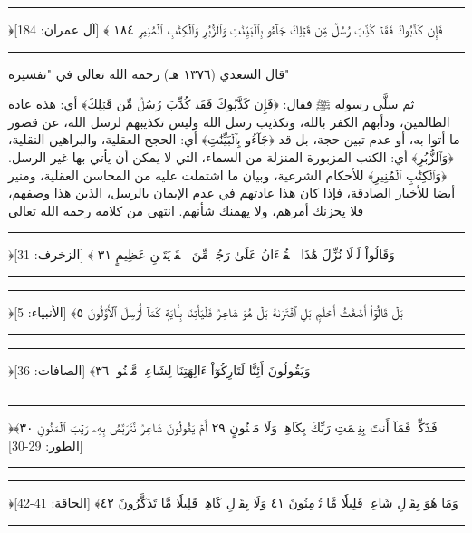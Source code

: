 \documentclass[12pt,openany]{book}
\newenvironment{quranblock}
  {\par\medskip\begin{center}\begin{minipage}{0.92\linewidth}\centering\quranfont\large\color{ink}\hrule\vspace{0.65em}}
  {\vspace{0.65em}\hrule\end{minipage}\end{center}\medskip}
\newenvironment{sourceintro}
  {\par\medskip\noindent\titlefont\color{gold}}
  {\par\smallskip}
\begin{document}
\begin{quranblock}
﴿فَإِن كَذَّبُوكَ فَقَدۡ كُذِّبَ رُسُلٞ مِّن قَبۡلِكَ جَآءُو بِٱلۡبَيِّنَٰتِ وَٱلزُّبُرِ ‌وَٱلۡكِتَٰبِ ٱلۡمُنِيرِ ١٨٤ ﴾ [آل عمران: 184]
\end{quranblock}

\begin{sourceintro}قال السعدي (١٣٧٦ هـ) رحمه الله تعالى في "تفسيره"\end{sourceintro}

ثم سلَّى رسوله ﷺ فقال: ﴿فَإِن كَذَّبُوكَ فَقَدۡ كُذِّبَ رُسُلٞ مِّن قَبۡلِكَ﴾ أي: هذه عادة الظالمين، ودأبهم الكفر بالله، وتكذيب رسل الله وليس تكذيبهم لرسل الله، عن قصور ما أتوا به، أو عدم تبين حجة، بل قد ﴿جَآءُو بِٱلۡبَيِّنَٰتِ﴾ أي: الحجج العقلية، والبراهين النقلية، ﴿وَٱلزُّبُرِ﴾ أي: الكتب المزبورة المنزلة من السماء، التي لا يمكن أن يأتي بها غير الرسل. ﴿وَٱلۡكِتَٰبِ ٱلۡمُنِيرِ﴾ للأحكام الشرعية، وبيان ما اشتملت عليه من المحاسن العقلية، ومنير أيضا للأخبار الصادقة، فإذا كان هذا عادتهم في عدم الإيمان بالرسل، الذين هذا وصفهم، فلا يحزنك أمرهم، ولا يهمنك شأنهم. انتهى من كلامه رحمه الله تعالى

\begin{quranblock}
﴿وَقَالُواْ لَوۡلَا نُزِّلَ هَٰذَا ٱلۡقُرۡءَانُ عَلَىٰ رَجُلٖ مِّنَ ٱلۡقَرۡيَتَيۡنِ عَظِيمٍ ٣١ ﴾ [الزخرف: 31]
\end{quranblock}

\begin{quranblock}
﴿بَلۡ قَالُوٓاْ أَضۡغَٰثُ أَحۡلَٰمِۭ بَلِ ٱفۡتَرَىٰهُ بَلۡ هُوَ ‌شَاعِرٞ فَلۡيَأۡتِنَا بِـَٔايَةٖ كَمَآ أُرۡسِلَ ٱلۡأَوَّلُونَ ٥﴾ [الأنبياء: 5]
\end{quranblock}

\begin{quranblock}
﴿وَيَقُولُونَ أَئِنَّا لَتَارِكُوٓاْ ءَالِهَتِنَا ‌لِشَاعِرٖ مَّجۡنُونِۭ ٣٦﴾ [الصافات: 36]
\end{quranblock}

\begin{quranblock}
﴿فَذَكِّرۡ فَمَآ أَنتَ بِنِعۡمَتِ رَبِّكَ بِكَاهِنٖ وَلَا مَجۡنُونٍ ٢٩ أَمۡ يَقُولُونَ ‌شَاعِرٞ نَّتَرَبَّصُ بِهِۦ رَيۡبَ ٱلۡمَنُونِ ٣٠﴾ [الطور: 29-30]
\end{quranblock}

\begin{quranblock}
﴿وَمَا هُوَ بِقَوۡلِ ‌شَاعِرٖۚ قَلِيلٗا مَّا تُؤۡمِنُونَ ٤١ وَلَا بِقَوۡلِ كَاهِنٖۚ قَلِيلٗا مَّا تَذَكَّرُونَ ٤٢﴾ [الحاقة: 41-42]
\end{quranblock}
\end{document}
